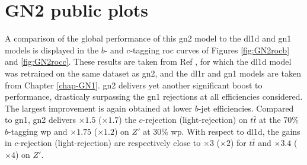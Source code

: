 \section{GN2 public plots}
A comparison of the global performance of this \gls{gn2} model to the \gls{dl1d} and \gls{gn1} models is displayed in the $b$- and $c$-tagging \gls{roc} curves of Figures \ref{fig:GN2rocb} and \ref{fig:GN2rocc}. These results are taken from Ref \cite{ATL-PLOT-FTAG-2023-01}, for which the \gls{dl1d} model was retrained on the same dataset as \gls{gn2}, and the \gls{dl1r} and \gls{gn1} models are taken from Chapter \ref{chap-GN1}. \gls{gn2} delivers yet another significant boost to performance, drasticaly surpassing the \gls{gn1} rejections at all efficiencies considered. The largest improvement is again obtained at lower $b$-jet efficiencies. Compared to \gls{gn1}, \gls{gn2} delivers $\times 1.5$ ($\times 1.7$) the $c$-rejection (light-rejection) on $t\bar{t}$ at the 70\% $b$-tagging \gls{wp} and $\times 1.75$ ($\times 1.2$) on $Z'$ at 30\% \gls{wp}. With respect to \gls{dl1d}, the gains in $c$-rejection (light-rejection) are respectively close to $\times 3$ ($\times 2$) for $t\bar{t}$ and $\times 3.4$ ($\times 4$) on $Z'$. 

